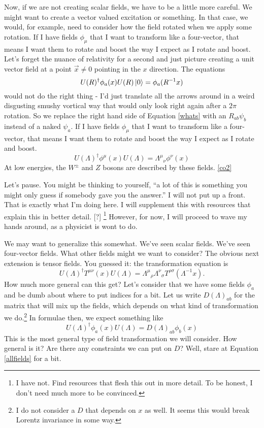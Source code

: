 \documentclass{book}
\begin{document}
Now, if we are not creating scalar fields, we have to be a little more careful. We might want to create a vector valued excitation or something. In that case, we would, for example, need to consider how the field rotated when we apply some rotation. If I have fields $\phi_\mu$ that I want to transform like a four-vector, that means I want them to rotate and boost the way I expect as I rotate and boost. Let's forget the nuance of relativity for a second and just picture creating a unit vector field at a point $\vec{x} \neq 0$ pointing in the $x$ direction. The equations
\begin{equation} \label{whats}
U(R)^\dagger \phi_a (x) U(R) \ket{0} = \phi_a (R^{-1} x) 
\end{equation}
would not do the right thing - I'd just translate all the arrows around in a weird disgusting smushy vortical way that would only look right again after a $2\pi$ rotation. So we replace the right hand side of Equation \ref{whats} with an $R_{ab} \psi_b$ instead of a naked $\psi_a$. If I have fields $\phi_\mu$ that I want to transform like a four-vector, that means I want them to rotate and boost the way I expect as I rotate and boost.
\[
U(\Lambda)^\dagger \phi^\mu (x) U(\Lambda) = {\Lambda^\mu}_\nu \phi^\nu (x)
\]
At low energies, the $W^\pm$ and $Z$ bosons are described by these fields. \ref{co2}

Let's pause. You might be thinking to yourself,  ``a lot of this is something you might only guess if somebody gave you the answer.'' I will not put up a front. That is exactly what I'm doing here. I will supplement this with resources that explain this in better detail. [?] \footnote{I have not. Find resources that flesh this out in more detail. To be honest, I don't need much more to be convinced.} However, for now, I will proceed to wave my hands around, as a physicist is wont to do.

We may want to generalize this somewhat. We've seen scalar fields. We've seen four-vector fields. What other fields might we want to consider? The obvious next extension is tensor fields. You guessed it: the transformation equation is
\[
U(\Lambda)^\dagger T^{\mu \nu} (x) U(\Lambda) = {\Lambda^\mu}_\rho {\Lambda^\nu}_\sigma T^{\rho \sigma} (\Lambda^{-1}x).
\]
How much more general can this get? Let's consider that we have some fields $\phi_a$ and be dumb about where to put indices for a bit. Let us write $D(\Lambda)_{ab}$ for the matrix that will mix up the fields, which depends on what kind of transformation we do.\footnote{I do not consider a $D$ that depends on $x$ as well. It seems this would break Lorentz invariance in some way.} In formulae then, we expect something like
\begin{equation} \label{allfields}
\boxed{U(\Lambda)^\dagger \phi_a (x) U(\Lambda) = D(\Lambda)_{ab} \phi_b (x)}
\end{equation}
This is the most general type of field transformation we will consider. How general is it? Are there any constraints we can put on $D$? Well, stare at Equation \ref{allfields} for a bit. 
\end{document}
